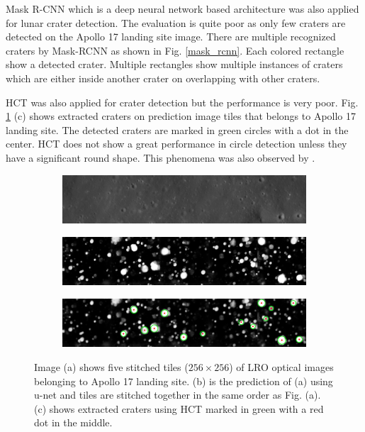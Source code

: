\documentclass[11pt]{article}
\begin{document}
Mask R-CNN which is a deep neural network based architecture was also applied for lunar crater detection. The evaluation is quite poor as only few craters are detected on the Apollo 17 landing site image. There are multiple recognized craters by Mask-RCNN as shown in Fig. \ref{mask_rcnn}. Each colored rectangle show a detected crater. Multiple rectangles show multiple instances of craters which are either inside another crater on overlapping with other craters. 

HCT was also applied for crater detection but the performance is very poor. Fig. \ref{hough} (c) shows extracted craters on prediction image tiles that belongs to Apollo 17 landing site. The detected craters are marked in green circles with a dot in the center. HCT does not show a great performance in circle detection unless they have a significant round shape. This phenomena was also observed by \cite{wetzler2005learning}.

\begin{figure}[H]
	\begin{subfigure}{\linewidth}
		\centering
		\includegraphics[width=.8\textwidth]{files/results/hcon_thesis-1_original.png}
		\caption{}
	\end{subfigure}\par\medskip
	\begin{subfigure}{\linewidth}
		\centering
		\includegraphics[width=.8\textwidth]{files/results/hcon_thesis-1.png}
		\caption{}
	\end{subfigure}\par\medskip
	\begin{subfigure}{\linewidth}
		\centering
		\includegraphics[width=.8\textwidth]{files/results/with_circles.png}
		\caption{}
	\end{subfigure}
	\caption{Image (a) shows five stitched tiles ($256 \times 256$) of LRO optical images belonging to Apollo 17 landing site. (b) is the prediction of (a) using u-net and tiles are stitched together in the same order as Fig. (a). (c) shows extracted craters using HCT marked in green with a red dot in the middle.}
	\label{hough}
\end{figure}
 
\end{document}
